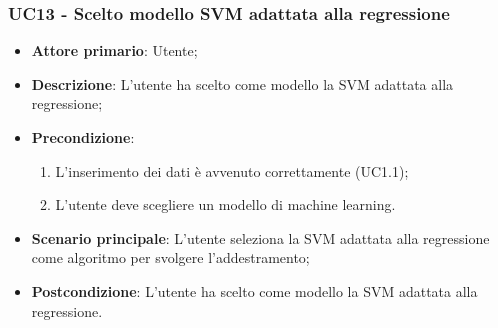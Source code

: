 \subsubsection{UC13 - Scelto modello SVM adattata alla regressione}
\label{sssec:uc13}
\begin{itemize}
  \item \textbf{Attore primario}: Utente;
  \item \textbf{Descrizione}: L'utente ha scelto come modello la SVM adattata alla regressione;
  \item \textbf{Precondizione}:
  \begin{enumerate}
    \item L'inserimento dei dati è avvenuto correttamente (UC1.1);
    \item L'utente deve scegliere un modello di machine learning.
  \end{enumerate}
  \item \textbf{Scenario principale}: L'utente seleziona la SVM adattata alla regressione come algoritmo per svolgere l'addestramento;
  \item \textbf{Postcondizione}: L'utente ha scelto come modello la SVM adattata alla regressione.
\end{itemize}
